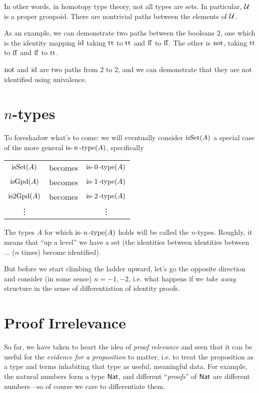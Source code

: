 \documentclass[11pt]{article}
\begin{document}
In other words, in homotopy type theory, not all types are sets. In
particular, $\mathcal{U}$ is a proper groupoid. There are nontrivial paths
between the elements of $\mathcal{U}$.

As an example, we can demonstrate two paths between the booleans
$2$, one which is the identity mapping $\operatorname{id}$ taking $\operatorname{tt}$
to $\operatorname{tt}$ and $\operatorname{ff}$ to $\operatorname{ff}$. The other is $\operatorname{not}$, taking
$\operatorname{tt}$ to $\operatorname{ff}$ and $\operatorname{ff}$ to $\operatorname{tt}$.

$\operatorname{not}$ and $\operatorname{id}$ are two paths from ${2}$ to ${2}$,
and we can demonstrate that they are not identified using univalence.


\section{$n$-types}

To foreshadow what's to come: we will eventually consider $\operatorname{isSet}(A)$ a
special case of the more general $\operatorname{is-}n\operatorname{-type}(A)$, specifically

\newcommand{\isntype}[1]{\op{is-}{#1}\op{-type}}

\begin{tabular}{ccc}
$\operatorname{isSet}(A)$ & becomes & $\isntype{0}(A)$ \\
$\operatorname{isGpd}(A)$ & becomes & $\isntype{1}(A)$ \\
$\operatorname{is2Gpd}(A)$ & becomes & $\isntype{2}(A)$ \\
\vdots & & \vdots
\end{tabular}
\bigskip

The types $A$ for which $\operatorname{is-}n\operatorname{-type}(A)$ holds will be called the
$n$-types. Roughly, it means that ``up a level'' we have a set (the
identities between identities between ... ($n$ times) become identified).

But before we start climbing the ladder upward, let's go the opposite
direction and consider (in some sense) $n=-1, -2$, i.e. what happens if we
{\em take away} structure in the sense of differentiation of identity
proofs.

\section{Proof Irrelevance}

So far, we have taken to heart the idea of {\em proof relevance} and seen
that it can be useful for the {\em evidence for a proposition} to matter,
i.e. to treat the proposition as a type and terms inhabiting that type as
useful, meaningful data. For example, the natural numbers form a type
$\mathsf{Nat}$, and different ``{\em proofs}'' of $\mathsf{Nat}$ are different
numbers---so of course we care to differentiate them.
\end{document}

